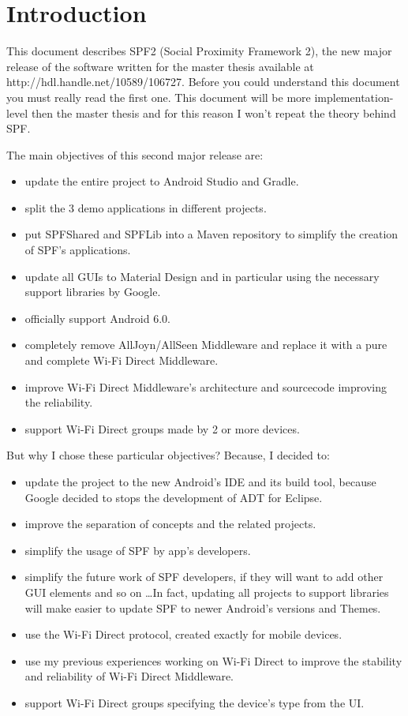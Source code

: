 \chapter{Introduction}
\label{chap1}

This document describes SPF2 (Social Proximity Framework 2), the new major release of the software written for the master thesis available at http://hdl.handle.net/10589/106727. Before you could understand this document you must really read the first one. This document will be more implementation-level then the master thesis and for this reason I won't repeat the theory behind SPF.

\noindent The main objectives of this second major release are:
\begin{itemize}
	\item update the entire project to Android Studio and Gradle.
	\item split the 3 demo applications in different projects.
	\item put \textsf{SPFShared} and \textsf{SPFLib} into a Maven repository to simplify the creation of SPF's applications.
	\item update all GUIs to Material Design and in particular using the necessary support libraries by Google.
	\item officially support Android 6.0.
	\item completely remove AllJoyn/AllSeen Middleware and replace it with a pure and complete Wi-Fi Direct Middleware.
	\item improve Wi-Fi Direct Middleware's architecture and sourcecode improving the reliability.
	\item support Wi-Fi Direct groups made by 2 or more devices.
\end{itemize}

\noindent But why I chose these particular objectives? Because, I decided to:
\begin{itemize}
	\item update the project to the new Android's IDE and its build tool, because Google decided to stops the development of ADT for Eclipse.
	\item improve the separation of concepts and the related projects.
	\item simplify the usage of SPF by app's developers.
	\item simplify the future work of SPF developers, if they will want to add other GUI elements and so on \dots In fact, updating all projects to support libraries will make easier to update SPF to newer Android's versions and Themes.
	\item use the Wi-Fi Direct protocol, created exactly for mobile devices.
	\item use my previous experiences working on Wi-Fi Direct to improve the stability and reliability of Wi-Fi Direct Middleware.
	\item support Wi-Fi Direct groups specifying the device's type from the UI.
\end{itemize}

